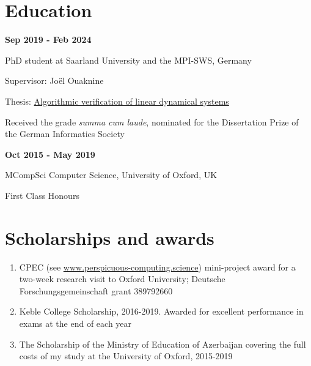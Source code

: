 \documentclass{article}
\begin{document}
	\section*{Education}
		\begin{minipage}{0.3\textwidth}
			\hspace{0.1cm} \textbf{Sep 2019 - Feb 2024}
		\end{minipage}
		\vspace*{0.25cm}
		\begin{minipage}{0.7\textwidth}
			PhD student at Saarland University and the MPI-SWS, Germany
			
			\vspace*{0.2cm}
			Supervisor: Jo\"el Ouaknine 
			
			\vspace*{0.2cm}
			Thesis: \href{https://publikationen.sulb.uni-saarland.de/handle/20.500.21880/37285}{Algorithmic verification of linear dynamical systems}
			
			\vspace*{0.2cm}
			Received the grade \emph{summa cum laude}, nominated for the Dissertation Prize of the German Informatics Society
                \vspace{0.3cm}
		\end{minipage}
		\vspace{0.85cm}
		\begin{minipage}{0.3\textwidth}
		\hspace{0.1 cm} \textbf{Oct 2015 - May 2019}
	\end{minipage}
	\begin{minipage}{0.7\textwidth}
		MCompSci Computer Science, University of Oxford, UK
		
		\vspace*{0.2cm}
		First Class Honours
	\end{minipage}
	
	\section*{Scholarships and awards}
	\begin{enumerate}
		\item CPEC (see \url{www.perspicuous-computing.science}) mini-project award for a two-week research visit to Oxford University; Deutsche Forschungsgemeinschaft grant 389792660
		\item Keble College Scholarship, 2016-2019. Awarded for excellent performance in exams at the end of each year
		\item The Scholarship of the Ministry of Education of Azerbaijan covering the full costs of my study at the University of Oxford, 2015-2019
	\end{enumerate}
	
\end{document}
